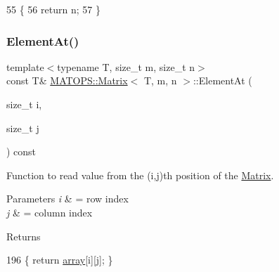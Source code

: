 \begin{DoxyCode}
55                         \{
56                                 \textcolor{keywordflow}{return} n;
57                         \}
\end{DoxyCode}
\mbox{\label{classMATOPS_1_1Matrix_a9eabd6b452bd01040c9ecaadc2ad6562}} 
\subsubsection{\texorpdfstring{Element\+At()}{ElementAt()}\hspace{0.1cm}{\footnotesize\ttfamily [1/2]}}
{\footnotesize\ttfamily template$<$typename T, size\+\_\+t m, size\+\_\+t n$>$ \\
const T\& \hyperlink{classMATOPS_1_1Matrix}{M\+A\+T\+O\+P\+S\+::\+Matrix}$<$ T, m, n $>$\+::Element\+At (\begin{DoxyParamCaption}\item[{size\+\_\+t}]{i,  }\item[{size\+\_\+t}]{j }\end{DoxyParamCaption}) const\hspace{0.3cm}{\ttfamily [inline]}}



Function to read value from the (i,j)th position of the \hyperlink{classMATOPS_1_1Matrix}{Matrix}. 


\begin{DoxyParams}{Parameters}
{\em i} & = row index \\
\hline
{\em j} & = column index \\
\hline
\end{DoxyParams}
\begin{DoxyReturn}{Returns}

\end{DoxyReturn}

\begin{DoxyCode}
196                                         \{ \textcolor{keywordflow}{return} \hyperlink{classMATOPS_1_1Matrix_af2a995c9d251f109d54040e2732a93f0}{array}[i][j]; \}
\end{DoxyCode}
\mbox{\label{classMATOPS_1_1Matrix_a28edfa65a7b0f5cbeb96d91bfaee4d6a}} 
